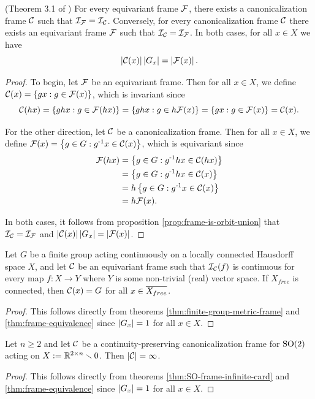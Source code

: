 \begin{theorem}\label{thm:frame-equivalence}
    (Theorem 3.1 of \cite{ma2024canonicalizationperspectiveinvariantequivariant})
    For every equivariant frame $\mathcal{F}$, there exists a canonicalization frame $\mathcal{C}$ such that $\mathcal{I}_{\mathcal{F}} = \mathcal{I}_{\mathcal{C}}$.
    Conversely, for every canonicalization frame $\mathcal{C}$ there exists an equivariant frame $\mathcal{F}$ such that $\mathcal{I}_{\mathcal{C}} = \mathcal{I}_{\mathcal{F}}$.
    In both cases, for all $x \in X$ we have
    \[
        \left| \mathcal{C}(x) \right| \left| G_x \right| = \left| \mathcal{F}(x) \right|.
    \]
    \begin{proof}
        To begin, let $\mathcal{F}$ be an equivariant frame.
        Then for all $x \in X$, we define $\mathcal{C}(x) = \left\{ g x : g \in \mathcal{F}(x) \right\}$, which is invariant since
        \[
            \mathcal{C}(hx)
            = \left\{ g h x : g \in \mathcal{F}(hx) \right\}
            = \left\{ g h x : g \in h \mathcal{F}(x) \right\}
            = \left\{ g x : g \in \mathcal{F}(x) \right\}
            = \mathcal{C}(x).
        \]
        
        For the other direction, let $\mathcal{C}$ be a canonicalization frame.
        Then for all $x \in X$, we define $\mathcal{F}(x) = \left\{ g \in G : g^{\text{-}1} x \in \mathcal{C}(x) \right\}$, which is equivariant since
        \begin{align*}
            \mathcal{F}(hx)
            &= \left\{ g \in G : g^{\text{-}1} h x \in \mathcal{C}(h x) \right\} \\
            &= \left\{ g \in G : g^{\text{-}1} h x \in \mathcal{C}(x) \right\} \\
            &= h \left\{ g \in G : g^{\text{-}1} x \in \mathcal{C}(x) \right\} \\
            &= h \mathcal{F}(x).
        \end{align*}

        In both cases, it follows from proposition \ref{prop:frame-is-orbit-union} that $\mathcal{I}_{\mathcal{C}} = \mathcal{I}_{\mathcal{F}}$ and $\left| \mathcal{C}(x) \right| \left| G_x \right| = \left| \mathcal{F}(x) \right|$.
    \end{proof}
\end{theorem}


\begin{corollary}
    Let $G$ be a finite group acting continuously on a locally connected Hausdorff space $X$, and let $\mathcal{C}$ be an equivariant frame such that $\mathcal{I}_{\mathcal{C}} (f)$ is continuous for every map $f : X \to Y$ where $Y$ is some non-trivial (real) vector space.
    If $X_{free}$ is connected, then $\mathcal{C}(x) = G$ for all $x \in \overline{X_{free}}$.
    \begin{proof}
        This follows directly from theorems \ref{thm:finite-group-metric-frame} and \ref{thm:frame-equivalence} since $\left| G_x \right| = 1$ for all $x \in X$.
    \end{proof}
\end{corollary}


\begin{corollary}
    Let $n \geq 2$ and let $\mathcal{C}$ be a continuity-preserving canonicalization frame for $\operatorname{SO}(2)$ acting on $X := \mathbb{R}^{2 \times n} \smallsetminus 0$.
    Then $\left| \mathcal{C} \right| = \infty$.
    \begin{proof}
        This follows directly from theorems \ref{thm:SO-frame-infinite-card} and \ref{thm:frame-equivalence} since $\left| G_x \right| = 1$ for all $x \in X$.
    \end{proof}
\end{corollary}

